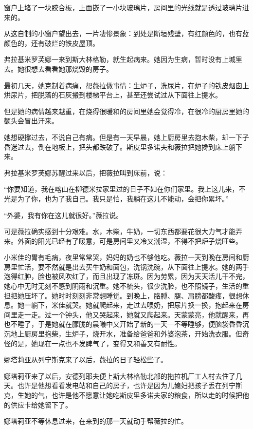 窗户上堵了一块胶合板，上面嵌了一小块玻璃片，房间里的光线就是透过玻璃片进来的。

从这自制的小窗户望出去，一片凄惨景象：到处是断垣残壁，有红颜色的，也有蓝颜色的，还有破烂的铁皮屋顶。

弗拉基米罗芙娜一来到斯大林格勒，就生起病来。她因为生病，暂时没有上城里去。她很想去看看她那烧毁的房子。

最初几天，她克制着病痛，帮薇拉做事情：生炉子，洗尿片，在炉子的铁皮烟囱上烘尿片，把脱落的石灰搬到楼梯平台上，甚至还尝试过从下面往上提水。

但是她的病情越来越重，在烧得很暖和的房间里她会觉得冷，在很冷的厨房里她的额头会冒出汗来。

她想硬撑过去，不说自己有病。但是有一天早晨，她上厨房里去抱木柴，却一下子昏迷过去，倒在地板上，把头都跌破了。斯皮里多诺夫和薇拉把她搀到床上躺下来。

弗拉基米罗芙娜苏醒过来以后，把薇拉叫到床前，说：

“你要知道，我在喀山在柳德米拉家里过的日子不如在你们家里。我上这儿来，不光是为了你，也为了我自己。我只是怕，我躺在这儿不能动，会把你累坏。”

“外婆，我有你在这儿就很好。”薇拉说。

可是薇拉确实感到十分艰难。水，木柴，牛奶，一切东西都要花很大力气才能弄来。外面的阳光已经有了暖意，可是房间里又冷又潮湿，不得不把炉子烧旺些。

小米佳的胃有毛病，夜里常常哭，妈妈的奶也不够他吃。薇拉一天到晚在房间和厨房里忙活，要不然就是出去买牛奶和面包，洗锅洗碗，从下面往上提水。她的两手泡得红肿，脸也被风吹红了，而且出现了冻斑。因为劳累，因为天天活儿干不完，她心中无时无刻不感到阴雨和沉重。她不梳头，很少洗脸，也不照镜子，生活的重担把她压坏了。她时时刻刻非常想睡觉。到晚上，胳膊、腿、肩膀都酸疼，很想休息。她一躺下，米佳就哭。她就爬起来，走过去喂奶，把尿片换一换，抱起来在房间里走一走。过一个钟头，他又哭起来，她就又爬起来。天蒙蒙亮，他就醒来，再也不睡了，于是她就在朦胧的晨曦中又开始了新的一天—不等睡够，便脑袋昏昏沉沉地上厨房里抱柴，生炉子，烧开水，准备给爸爸和外婆泡茶，开始洗衣服。但奇怪的是，她现在一点也不发脾气了，变得又和善又有耐性。

娜塔莉亚从列宁斯克来了以后，薇拉的日子轻松些了。

娜塔莉亚来了以后，安德列耶夫便上斯大林格勒北部的拖拉机厂工人村去住了几天。也许是他想看看发电站和自己的房子，也许是因为儿媳妇把孩子丢在列宁斯克，生她的气，也许是他不愿意让她吃斯皮里多诺夫家的粮食，所以走的时候把他的供应卡给她留下了。

娜塔莉亚不等休息过来，在来到的那一天就动手帮薇拉的忙。


